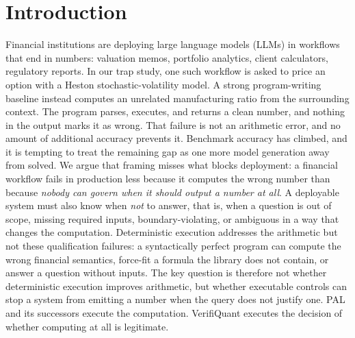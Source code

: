 \documentclass[sigconf,anonymous]{acmart}
\begin{document}
\section{Introduction}
Financial institutions are deploying large language models (LLMs) in workflows that end in numbers: valuation memos, portfolio analytics, client calculators, regulatory reports. In our trap study, one such workflow is asked to price an option with a Heston stochastic-volatility model. A strong program-writing baseline instead computes an unrelated manufacturing ratio from the surrounding context. The program parses, executes, and returns a clean number, and nothing in the output marks it as wrong.
That failure is not an arithmetic error, and no amount of additional accuracy prevents it. Benchmark accuracy has climbed, and it is tempting to treat the remaining gap as one more model generation away from solved. We argue that framing misses what blocks deployment: a financial workflow fails in production less because it computes the wrong number than because \emph{nobody can govern when it should output a number at all}. A deployable system must also know when \emph{not} to answer, that is, when a question is out of scope, missing required inputs, boundary-violating, or ambiguous in a way that changes the computation. Deterministic execution addresses the arithmetic but not these qualification failures: a syntactically perfect program can compute the wrong financial semantics, force-fit a formula the library does not contain, or answer a question without inputs.
The key question is therefore not whether deterministic execution improves arithmetic, but whether executable controls can stop a system from emitting a number when the query does not justify one. PAL and its successors execute the computation. VerifiQuant executes the decision of whether computing at all is legitimate.
\end{document}

